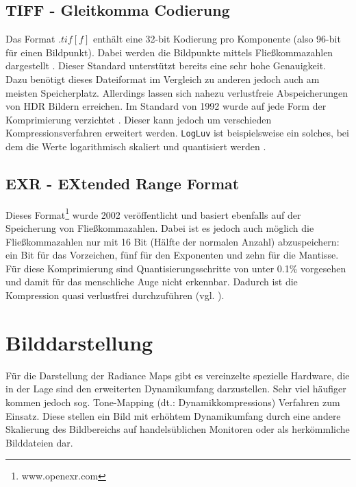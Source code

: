 \subsection{TIFF - Gleitkomma Codierung}
\label{sub:tiff}
Das Format $.tif[f]$ enthält eine 32-bit Kodierung pro Komponente (also 96-bit für einen Bildpunkt). Dabei werden die Bildpunkte mittels Fließkommazahlen dargestellt \cite{adobe:tiff}. Dieser Standard unterstützt bereits eine sehr hohe Genauigkeit. Dazu benötigt dieses Dateiformat im Vergleich zu anderen jedoch auch am meisten Speicherplatz. Allerdings lassen sich nahezu verlustfreie Abspeicherungen von \gls{HDR} Bildern erreichen. Im Standard von 1992 wurde auf jede Form der Komprimierung verzichtet \cite[S. 93]{Reinhard}. Dieser kann jedoch um verschieden Kompressionsverfahren erweitert werden. \texttt{LogLuv} ist beispielsweise ein solches, bei dem die Werte logarithmisch skaliert und quantisiert werden \cite{logluv}. 


\subsection{EXR - EXtended Range Format}

Dieses Format\footnote{www.openexr.com} wurde 2002 veröffentlicht und basiert ebenfalls auf der Speicherung von Fließkommazahlen. Dabei ist es jedoch auch möglich die Fließkommazahlen nur mit 16 Bit (Hälfte der normalen Anzahl) abzuspeichern: ein Bit für das Vorzeichen, fünf für den Exponenten und zehn für die Mantisse. Für diese Komprimierung sind Quantisierungsschritte von unter 0.1\% vorgesehen und damit für das menschliche Auge nicht erkennbar. Dadurch ist die Kompression quasi verlustfrei durchzuführen (vgl. \cite[S. 97f]{Reinhard}).

\section{Bilddarstellung}
\label{subsec:ToneMapping}
 Für die Darstellung der \glspl{Radiance Map} gibt es vereinzelte spezielle Hardware, die in der Lage sind den erweiterten Dynamikumfang darzustellen. Sehr viel häufiger kommen jedoch sog. \gls{Tone-Mapping} (dt.: Dynamikkompressions) Verfahren zum Einsatz. Diese stellen ein Bild mit erhöhtem \gls{Dynamikumfang} durch eine andere Skalierung des Bildbereichs auf handelsüblichen Monitoren oder als herkömmliche Bilddateien dar. 
 
